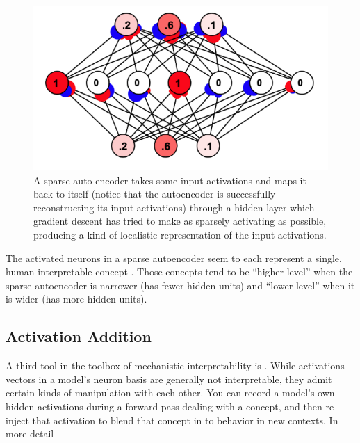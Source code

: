 \begin{figure}[ht]
\centering
\includegraphics[scale=.5]{./images/saeSimbrain.png}
\caption[Simbrain screenshot from Jeff Yoshimi.]{ A sparse auto-encoder takes
      some input activations and maps it back to itself (notice that the
      autoencoder is successfully reconstructing its input activations)
      through a hidden layer which gradient descent has tried to make
      as sparsely activating as possible, producing a kind of localistic representation of
      the input activations. }
\label{saeSimbrain}
\end{figure}

The activated neurons in a sparse autoencoder seem to each represent a single,
human-interpretable concept \cite{cunningham2023sparse,
bricken2023monosemanticity}. Those concepts tend to be ``higher-level'' when
the sparse autoencoder is narrower (has fewer hidden units) and ``lower-level''
when it is wider (has more hidden units).


\subsection{Activation Addition}

A third tool in the toolbox of mechanistic interpretability is
. While activations vectors in a model's neuron
basis are generally not interpretable, they admit certain kinds of manipulation
with each other. You can record a model's own hidden activations during a
forward pass dealing with a concept, and then re-inject that activation to
blend that concept in to behavior in new contexts. In more detail

